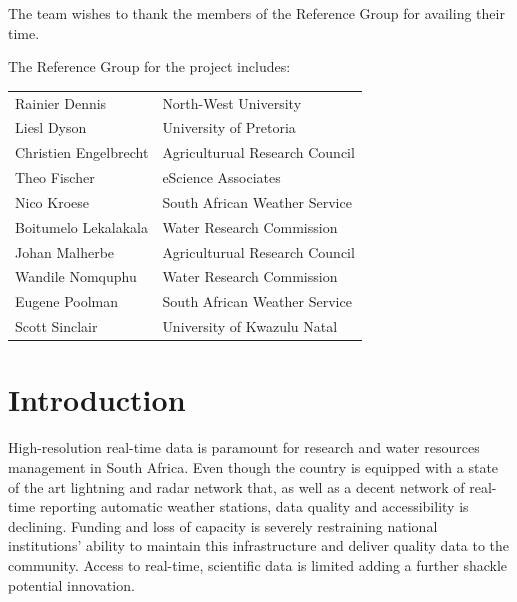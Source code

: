 \documentclass{wrcreport}
\begin{document}
The team wishes to thank the members of the Reference Group for
availing their time.

The Reference Group for the project includes:

\begin{tabular}{ l l }
Rainier Dennis & North-West University \\
Liesl Dyson & University of Pretoria \\
Christien Engelbrecht & Agriculturual Research Council \\
Theo Fischer & eScience Associates \\
Nico Kroese & South African Weather Service \\
Boitumelo Lekalakala & Water Research Commission \\
Johan Malherbe &  Agriculturual Research Council \\
Wandile Nomquphu & Water Research Commission \\
Eugene Poolman & South African Weather Service \\
Scott Sinclair & University of Kwazulu Natal \\
\end{tabular}
\clearpage

\dominitoc
\setcounter{tocdepth}{1} %
{\thispagestyle{plain}
  \tableofcontents
\printglossaries
}


\chapter{Introduction}


High-resolution real-time data is paramount for research and water
resources management in South Africa. Even though the country is
equipped with a state of the art lightning and radar network that, as
well as a decent network of real-time reporting automatic weather
stations, data quality and accessibility is declining. Funding and
loss of capacity is severely restraining national institutions'
ability to maintain this infrastructure and deliver quality data to
the community. Access to real-time, scientific data is limited adding
a further shackle potential innovation.
\end{document}
